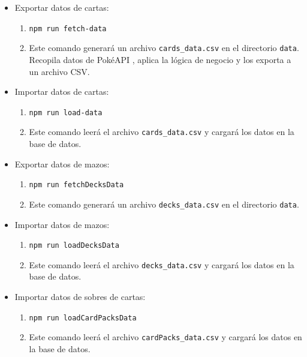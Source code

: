 \begin{itemize}
    \item Exportar datos de cartas:
    \begin{enumerate}
        \item \texttt{npm run fetch-data}
        \item Este comando generará un archivo \texttt{cards\_data.csv} en el directorio \texttt{data}. Recopila datos de PokéAPI
        , aplica la lógica de negocio y los exporta a un archivo CSV.
    \end{enumerate}
    \item Importar datos de cartas:
    \begin{enumerate}
        \item \texttt{npm run load-data}
        \item Este comando leerá el archivo \texttt{cards\_data.csv} y cargará los datos en la base de datos.
    \end{enumerate}
    \item Exportar datos de mazos:
    \begin{enumerate}
        \item \texttt{npm run fetchDecksData}
        \item Este comando generará un archivo \texttt{decks\_data.csv} en el directorio \texttt{data}.
    \end{enumerate}
    \item Importar datos de mazos:
    \begin{enumerate}
        \item \texttt{npm run loadDecksData}
        \item Este comando leerá el archivo \texttt{decks\_data.csv} y cargará los datos en la base de datos.
    \end{enumerate}
    \item Importar datos de sobres de cartas:
    \begin{enumerate}
        \item \texttt{npm run loadCardPacksData}
        \item Este comando leerá el archivo \texttt{cardPacks\_data.csv} y cargará los datos en la base de datos.
    \end{enumerate}
\end{itemize}
